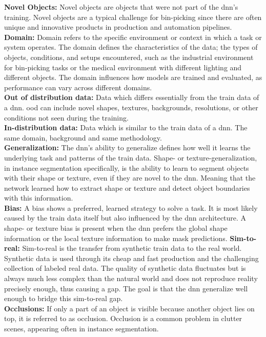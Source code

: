 		\textbf{Novel Objects:} Novel objects are objects that were not part of the \ac{dnn}'s training. Novel objects are a typical challenge for bin-picking since there are often unique and innovative products in production and automation pipelines.\\
		\textbf{Domain:} Domain refers to the specific environment or context in which a task or system operates. The domain defines the characteristics of the data; the types of objects, conditions, and setups encountered, such as the industrial environment for bin-picking tasks or the medical environment with different lighting and different objects. The domain influences how models are trained and evaluated, as performance can vary across different domains.\\
		\textbf{Out of distribution data:} Data which differs essentially from the train data of a \ac{dnn}. \acl{ood} can include novel shapes, textures, backgrounds, resolutions, or other conditions not seen during the training.\\
		\textbf{In-distribution data:} Data which is similar to the train data of a \ac{dnn}. The same domain, background and same methodology.\\
		\textbf{Generalization:} The \ac{dnn}'s ability to generalize defines how well it learns the underlying task and patterns of the train data. Shape- or texture-generalization, in instance segmentation specifically, is the ability to learn to segment objects with their shape or texture, even if they are novel to the \ac{dnn}. Meaning that the network learned how to extract shape or texture and detect object boundaries with this information. \\
		\textbf{Bias:} A bias shows a preferred, learned strategy to solve a task. It is most likely caused by the train data itself but also influenced by the \ac{dnn} architecture. A shape- or texture bias is present when the \ac{dnn} prefers the global shape information or the local texture information to make mask predictions.
		\clearpage
		\textbf{Sim-to-real:} Sim-to-real is the transfer from synthetic train data to the real world. Synthetic data is used through its cheap and fast production and the challenging collection of labeled real data. The quality of synthetic data fluctuates but is always much less complex than the natural world and does not reproduce reality precisely enough, thus causing a gap. The goal is that the \ac{dnn} generalize well enough to bridge this sim-to-real gap.\\
		\textbf{Occlusions:} If only a part of an object is visible because another object lies on top, it is referred to as occlusion. Occlusion is a common problem in clutter scenes, appearing often in instance segmentation.
		
